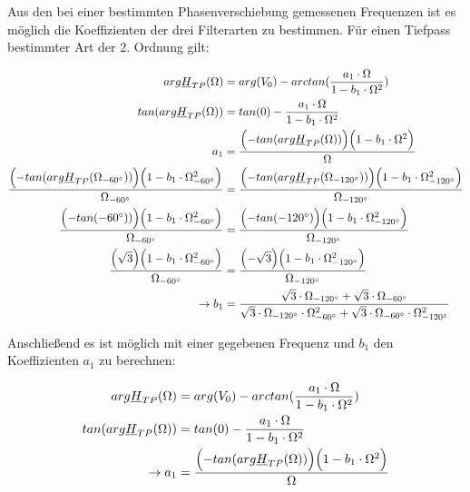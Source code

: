 \noindent Aus den bei einer bestimmten Phasenverschiebung gemessenen Frequenzen ist es möglich die Koeffizienten der drei Filterarten zu bestimmen. 
\noindent Für einen Tiefpass bestimmter Art der 2. Ordnung gilt:

\small{
\begin{alignat*}{2}
arg\underline{H}_{TP}(\Omega) &= arg(V_0) - arctan(\frac{a_1 \cdot \Omega}{1-b_1\cdot \Omega^2}) \\
tan(arg\underline{H}_{TP}(\Omega)) &= tan(0) - \frac{a_1 \cdot \Omega}{1-b_1\cdot \Omega^2}\\
a_1 &= \frac{\Bigl(- tan(arg\underline{H}_{TP}(\Omega))\Bigr)\Bigl(1-b_1 \cdot \Omega^2\Bigr)}{\Omega}\\
\frac{\Bigl(- tan(arg\underline{H}_{TP}(\Omega_{-60^\circ}))\Bigr)\Bigl(1-b_1 \cdot \Omega_{-60^\circ}^2\Bigr)}{\Omega_{-60^\circ}} &= \frac{\Bigl(- tan(arg\underline{H}_{TP}(\Omega_{-120^\circ}))\Bigr)\Bigl(1-b_1 \cdot \Omega_{-120^\circ}^2\Bigr)}{\Omega_{-120^\circ}}\\
\frac{\Bigl(- tan(-60^\circ))\Bigr)\Bigl(1-b_1 \cdot \Omega_{-60^\circ}^2\Bigr)}{\Omega_{-60^\circ}} &= \frac{\Bigl(- tan(-120^\circ)\Bigr)\Bigl(1-b_1 \cdot \Omega_{-120^\circ}^2\Bigr)}{\Omega_{-120^\circ}}\\
\frac{\Bigl( \sqrt{3} \Bigr)\Bigl(1-b_1 \cdot \Omega_{-60^\circ}^2\Bigr)}{\Omega_{-60^\circ}} &= \frac{\Bigl(-\sqrt{3}\Bigr)\Bigl(1-b_1 \cdot \Omega_{-120^\circ}^2\Bigr)}{\Omega_{-120^\circ}}\\
\rightarrow b_1 &= \frac{\sqrt{3}\cdot \Omega_{-120^\circ}+\sqrt{3}\cdot \Omega_{-60^\circ}}
{\sqrt{3}\cdot \Omega_{-120^\circ}\cdot \Omega_{-60^\circ}^2 +\sqrt{3}\cdot \Omega_{-60^\circ}\cdot \Omega_{-120^\circ}^2}
\end{alignat*}}

\newpage

\noindent Anschließend es ist möglich mit einer gegebenen Frequenz und $b_1$ den Koeffizienten $a_1$ zu berechnen:

\small{
	\begin{alignat*}{2}
	arg\underline{H}_{TP}(\Omega) &= arg(V_0) - arctan(\frac{a_1 \cdot \Omega}{1-b_1\cdot \Omega^2}) \\
	tan(arg\underline{H}_{TP}(\Omega)) &= tan(0) - \frac{a_1 \cdot \Omega}{1-b_1\cdot \Omega^2}\\
	\rightarrow a_1 &= \frac{\Bigl(- tan(arg\underline{H}_{TP}(\Omega))\Bigr)\Bigl(1-b_1 \cdot \Omega^2\Bigr)}{\Omega}\\
	\end{alignat*}}

